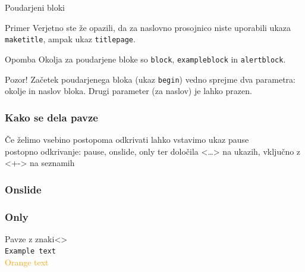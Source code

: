 \documentclass[14pt]{beamer}
\begin{document}
\begin{frame}{Poudarjeni bloki}

  \begin{exampleblock}{Primer}
    Verjetno ste že opazili, da za naslovno prosojnico niste uporabili
    ukaza \texttt{maketitle}, ampak ukaz \texttt{titlepage}.
  \end{exampleblock}

  \begin{block}{Opomba}
		Okolja za poudarjene bloke so \texttt{block}, \texttt{exampleblock} in \texttt{alertblock}.
	\end{block}
	
	\begin{alertblock}{Pozor!}
		Začetek poudarjenega bloka (ukaz \texttt{begin}) vedno sprejme 
	  dva parametra: okolje in naslov bloka.
	  Drugi parameter (za naslov) je lahko prazen.
	\end{alertblock}
	
\end{frame}


\begin{frame}
  \frametitle{Kako se dela pavze}
  Če želimo vsebino postopoma odkrivati
  lahko vstavimo ukaz pause\\
  \pause
  postopno odkrivanje: pause, onslide, only ter določila <…> na ukazih, vključno z <+-> na seznamih
\end{frame}

\begin{frame}
  \frametitle{Onslide}
  
  
\end{frame}

\begin{frame}
  \frametitle{Only}
  
  
\end{frame}

\begin{frame}{Pavze z znaki<>}
  \\
  \texttt<2>{Example text}\\
  \textcolor<3>{orange}{Orange text}
\end{frame}
\end{document}
